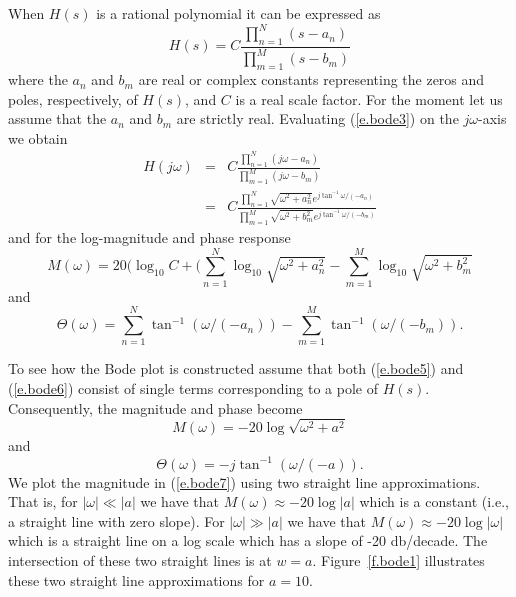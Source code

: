 	When $H(s)$ is a rational polynomial
it can be expressed as
%
\begin{equation}
H(s)=C\frac{\prod_{n=1}^{N}(s-a_n)}{\prod_{m=1}^{M}(s-b_m)}
\label{e.bode3}
\end{equation}
%
where the $a_n$ and $b_m$ are real or complex constants
representing the zeros and poles, respectively, of $H(s)$,
and $C$ is a real scale factor.
For the moment let us assume that the $a_n$ and $b_m$ are
strictly real.  Evaluating (\ref{e.bode3}) on the $j\omega$-axis
we obtain
%
\begin{eqnarray}
H(j\omega)&=&C\frac{\prod_{n=1}^{N}(j\omega-a_n)}{\prod_{m=1}^{M}(j\omega-b_m)}\nonumber\\
&=&C\frac{\prod_{n=1}^{N}\sqrt{\omega^2+a_n^2}e^{j\tan^{-1}\omega/(-a_n)}}{\prod_{m=1}^{M}\sqrt{\omega^2+b_m^2}e^{j\tan^{-1}\omega/(-b_m)}}
\label{e.bode4}
\end{eqnarray}
%
and for the log-magnitude and phase response 
%
\begin{equation}
M(\omega)=20(\log_{10}C+(\sum_{n=1}^{N}\log_{10}\sqrt{\omega^2+a_n^2}-\sum_{m=1}^M\log_{10}\sqrt{\omega^2+b_m^2}
\label{e.bode5}
\end{equation}
%
and
%
\begin{equation}
\Theta(\omega)=\sum_{n=1}^{N}\tan^{-1}(\omega/(-a_n))-\sum_{m=1}^M\tan^{-1}(\omega/(-b_m)).
\label{e.bode6}
\end{equation}
%

	To see how the Bode plot is
constructed assume that both (\ref{e.bode5}) and (\ref{e.bode6}) consist
of single terms corresponding to a pole of $H(s)$.  Consequently, the 
magnitude and phase become
%
\begin{equation}
M(\omega)=-20\log\sqrt{\omega^2+a^2}
\label{e.bode7}
\end{equation}
%
and
%
\begin{equation}
\Theta(\omega)=-j\tan^{-1}(\omega/(-a)).
\label{e.bode8}
\end{equation}
%
We plot the magnitude in (\ref{e.bode7}) using two straight line
approximations.  That is, for $|\omega|\ll|a|$ we have that $M(\omega)\approx
-20\log|a|$ which is a constant (i.e., a straight line with zero slope).
For $|\omega|\gg|a|$ we have that $M(\omega)\approx-20\log|\omega|$ which
is a straight line on a log scale which has a slope of -20 db/decade.
The intersection of these two straight lines is  at $w=a$.  
Figure~\ref{f.bode1} illustrates these two straight line approximations
for $a=10$.
%

%

